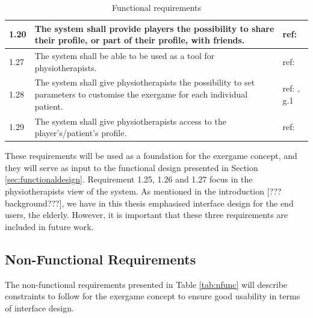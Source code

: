 \begin{table} [H]
\begin{tabular}{|>{\raggedright}p{}|p{}|p{2cm}|}
1.20 & The system shall provide players the possibility to share their profile, or part of their profile, with friends. & ref: \cite{sweetser}\\ \hline
1.27 & The system shall be able to be used as a tool for physiotherapists. & ref: \cite{project}\\ \hline
1.28 & The system shall give physiotherapists the possibility to set parameters to customise the exergame for each individual patient. & ref: \cite{project}, g.1  \\ \hline
1.29 & The system shall give physiotherapists access to the player's/patient's profile. & ref: \cite{project}\\ \hline  
\end{tabular}
\caption[Functional requirements, part 2]{Functional requirements}
\label{tab:func2}
\end{table} 

These requirements will be used as a foundation for the exergame concept, and they will serve as input to the functional design presented in Section \ref{sec:functionaldesign}. Requirement 1.25, 1.26 and 1.27 focus in the physiotherapists view of the system. As mentioned in the introduction [??? background???], we have in this thesis emphasised interface design for the end users, the elderly. However, it is important that these three requirements are included in future work.

\subsection{Non-Functional Requirements}
The non-functional requirements presented in Table \ref{tab:nfunc} will describe constraints to follow for the exergame concept to ensure good usability in terms of interface design.

